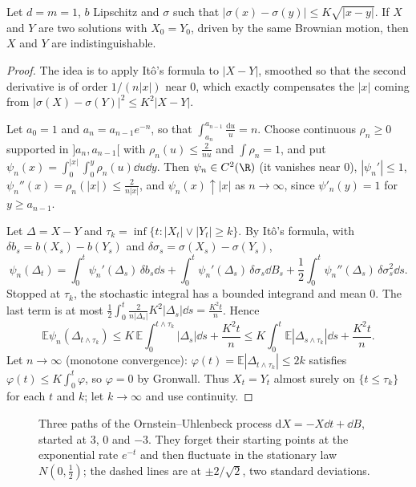 \begin{theorem}\label{thm:yamada}
Let $d=m=1$, $b$ Lipschitz and $\sigma$ such that $|\sigma(x)-\sigma(y)|\le K\sqrt{|x-y|}$. If $X$ and $Y$ are two solutions with $X_0=Y_0$, driven by the same Brownian motion, then $X$ and $Y$ are indistinguishable.
\end{theorem}

\begin{proof}
The idea is to apply It\^o's formula to $|X-Y|$, smoothed so that the second derivative is of order $1/(n|x|)$ near $0$, which exactly compensates the $|x|$ coming from $|\sigma(X)-\sigma(Y)|^2\le K^2|X-Y|$.

Let $a_0=1$ and $a_n=a_{n-1}e^{-n}$, so that $\int_{a_n}^{a_{n-1}}\frac{\mathrm du}u=n$. Choose continuous $\rho_n\ge0$ supported in $]a_n,a_{n-1}[$ with $\rho_n(u)\le\frac2{nu}$ and $\int\rho_n=1$, and put
$\psi_n(x)=\int_0^{|x|}\int_0^y\rho_n(u)\dd u\dd y$. Then $\psi_n\in C^2(\R)$ (it vanishes near $0$), $|\psi_n'|\le1$, $\psi_n''(x)=\rho_n(|x|)\le\frac2{n|x|}$, and $\psi_n(x)\uparrow|x|$ as $n\to\infty$,
since $\psi'_n(y)=1$ for $y\ge a_{n-1}$.

Let $\Delta=X-Y$ and $\tau_k=\inf\{t:|X_t|\vee|Y_t|\ge k\}$. By It\^o's formula,
with $\delta b_s=b(X_s)-b(Y_s)$ and $\delta\sigma_s=\sigma(X_s)-\sigma(Y_s)$,
\[
\psi_n(\Delta_t)=\int_0^t\psi_n'(\Delta_s)\,\delta b_s\dd s+\int_0^t\psi_n'(\Delta_s)\,\delta\sigma_s\dd B_s+\frac12\int_0^t\psi_n''(\Delta_s)\,\delta\sigma_s^2\dd s.
\]
Stopped at $\tau_k$, the stochastic integral has a bounded integrand and mean $0$. The last term is at most $\frac12\int_0^t\frac2{n|\Delta_s|}K^2|\Delta_s|\dd s=\frac{K^2t}n$. Hence
\[
\mathbb E\psi_n(\Delta_{t\wedge\tau_k})\le K\,\mathbb E\int_0^{t\wedge\tau_k}|\Delta_s|\dd s+\frac{K^2t}n\le K\int_0^t\mathbb E|\Delta_{s\wedge\tau_k}|\dd s+\frac{K^2t}n.
\]
Let $n\to\infty$ (monotone convergence): $\varphi(t)=\mathbb E|\Delta_{t\wedge\tau_k}|\le2k$ satisfies $\varphi(t)\le K\int_0^t\varphi$, so $\varphi=0$ by Gronwall. Thus $X_t=Y_t$ almost surely on $\{t\le\tau_k\}$ for each $t$ and
$k$; let $k\to\infty$ and use continuity.
\end{proof}

\begin{figure}[ht]
\centering
{}
\caption{Three paths of the Ornstein--Uhlenbeck process $\mathrm dX=-X\dd t+\dd B$, started at $3$, $0$ and $-3$. They forget their starting points at the exponential rate $e^{-t}$ and then fluctuate in the
stationary law $N(0,\frac12)$; the dashed lines are at $\pm2/\sqrt2$, two standard deviations.}
\label{fig:ou}
\end{figure}

